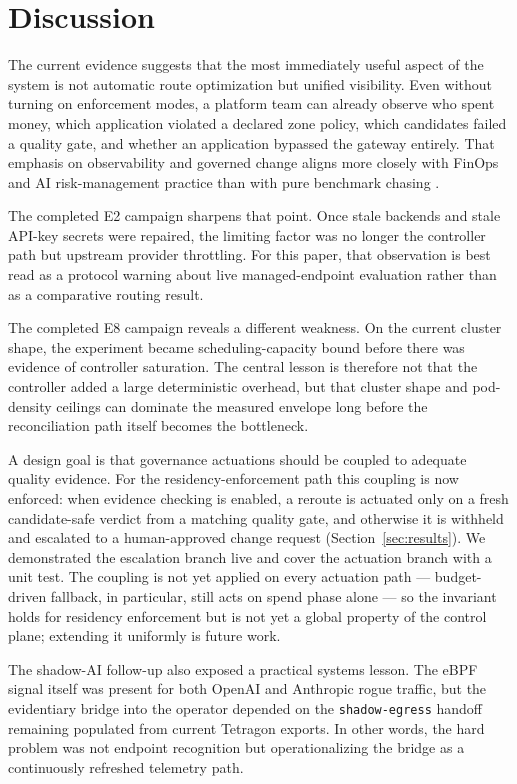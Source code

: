 \section{Discussion}
The current evidence suggests that the most immediately useful aspect of the system is not automatic route optimization but unified visibility. Even without turning on enforcement modes, a platform team can already observe who spent money, which application violated a declared zone policy, which candidates failed a quality gate, and whether an application bypassed the gateway entirely. That emphasis on observability and governed change aligns more closely with FinOps and AI risk-management practice than with pure benchmark chasing \cite{finopsIntroduction,finopsFramework,finopsGovernance,nistAIRMF,iso42001}.

The completed E2 campaign sharpens that point. Once stale backends and stale API-key secrets were repaired, the limiting factor was no longer the controller path but upstream provider throttling. For this paper, that observation is best read as a protocol warning about live managed-endpoint evaluation rather than as a comparative routing result.

The completed E8 campaign reveals a different weakness. On the current cluster shape, the experiment became scheduling-capacity bound before there was evidence of controller saturation. The central lesson is therefore not that the controller added a large deterministic overhead, but that cluster shape and pod-density ceilings can dominate the measured envelope long before the reconciliation path itself becomes the bottleneck.

A design goal is that governance actuations should be coupled to adequate quality evidence. For the residency-enforcement path this coupling is now enforced: when evidence checking is enabled, a reroute is actuated only on a fresh candidate-safe verdict from a matching quality gate, and otherwise it is withheld and escalated to a human-approved change request (Section~\ref{sec:results}). We demonstrated the escalation branch live and cover the actuation branch with a unit test. The coupling is not yet applied on every actuation path --- budget-driven fallback, in particular, still acts on spend phase alone --- so the invariant holds for residency enforcement but is not yet a global property of the control plane; extending it uniformly is future work.

The shadow-AI follow-up also exposed a practical systems lesson. The eBPF signal itself was present for both OpenAI and Anthropic rogue traffic, but the evidentiary bridge into the operator depended on the \texttt{shadow-egress} handoff remaining populated from current Tetragon exports. In other words, the hard problem was not endpoint recognition but operationalizing the bridge as a continuously refreshed telemetry path.


